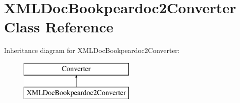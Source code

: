 \hypertarget{class_x_m_l_doc_bookpeardoc2_converter}{\section{\-X\-M\-L\-Doc\-Bookpeardoc2\-Converter \-Class \-Reference}
\label{class_x_m_l_doc_bookpeardoc2_converter}
}
\-Inheritance diagram for \-X\-M\-L\-Doc\-Bookpeardoc2\-Converter\-:\begin{figure}[H]
\begin{center}
\leavevmode
\includegraphics[height=2.000000cm]{class_x_m_l_doc_bookpeardoc2_converter}
\end{center}
\end{figure}
